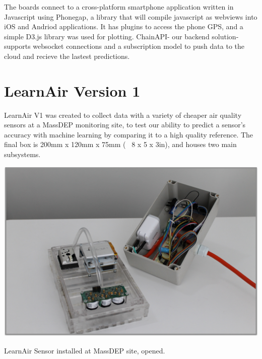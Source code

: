 The boards connect to a cross-platform smartphone application written in Javascript using Phonegap, a library that will compile javascript as webviews into iOS and Andriod applications.  It has plugins to access the phone GPS, and a simple D3.js library was used for plotting.  ChainAPI- our backend solution- supports  websocket connections and a subscription model to push data to the cloud and recieve the lastest predictions.



\section{LearnAir Version 1}
\FloatBarrier

LearnAir V1 was created to collect data with a variety of cheaper air quality sensors at a MassDEP monitoring site, to test our ability to predict a sensor's accuracy with machine learning by comparing it to a high quality reference.  The final box is 200mm x 120mm x 75mm (~ 8 x 5 x 3in), and houses two main subsystems.

\begin{marginfigure}
 	\includegraphics[width=\textwidth]{visuals/learnairV1}               
 	 \caption{LearnAir Sensor installed at MassDEP site, opened.}
  	\label{fig:learnairv1}
\end{marginfigure}

